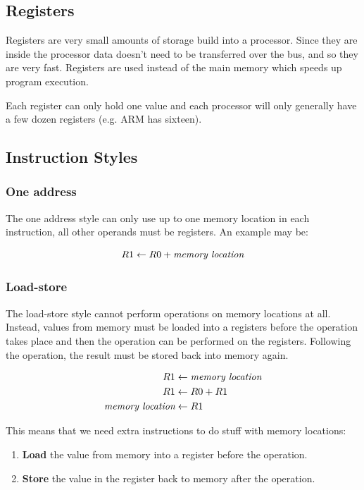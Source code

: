 \subsection{Registers}

Registers are very small amounts of storage build into a processor. Since they
are inside the processor data doesn't need to be transferred over the bus, and
so they are very fast. Registers are used instead of the main memory which
speeds up program execution.

Each register can only hold one value and each processor will only generally
have a few dozen registers (e.g. ARM has sixteen).

\subsection{Instruction Styles}

\subsubsection{One address}

The one address style can only use up to one memory location in each
instruction, all other operands must be registers. An example may be:

\[
    R1 \leftarrow R0 + \textrm{\it memory location}
\]

\subsubsection{Load-store}

The load-store style cannot perform operations on memory locations at all.
Instead, values from memory must be loaded into a registers before the operation
takes place and then the operation can be performed on the registers. Following
the operation, the result must be stored back into memory again.

\[
	\begin{split}
	    R1 &\leftarrow \textrm{\it memory location}\\
		R1 &\leftarrow R0 + R1\\
	    \textrm{\it memory location} &\leftarrow R1
    \end{split}
\]

This means that we need extra instructions to do stuff with memory locations:
\begin{enumerate}
	\item \textbf{Load} the value from memory into a register before the 
	operation.
	\item \textbf{Store} the value in the register back to memory after the 
	operation.
\end{enumerate}

